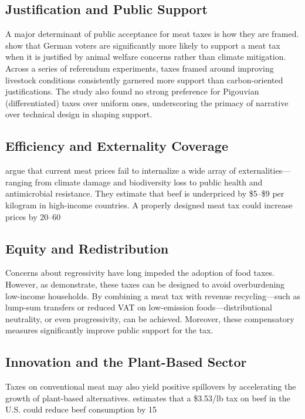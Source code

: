 \documentclass{article}[12pt,letterpaper]
\begin{document}
\subsection{Justification and Public Support}
A major determinant of public acceptance for meat taxes is how they are framed. \citet{Perino2023} show that German voters are significantly more likely to support a meat tax when it is justified by animal welfare concerns rather than climate mitigation. Across a series of referendum experiments, taxes framed around improving livestock conditions consistently garnered more support than carbon-oriented justifications. The study also found no strong preference for Pigouvian (differentiated) taxes over uniform ones, underscoring the primacy of narrative over technical design in shaping support.

\subsection{Efficiency and Externality Coverage}
\citet{Funke2022} argue that current meat prices fail to internalize a wide array of externalities—ranging from climate damage and biodiversity loss to public health and antimicrobial resistance. They estimate that beef is underpriced by \$5–\$9 per kilogram in high-income countries. A properly designed meat tax could increase prices by 20–60%

\subsection{Equity and Redistribution}
Concerns about regressivity have long impeded the adoption of food taxes. However, as \citet{Klenert2023} demonstrate, these taxes can be designed to avoid overburdening low-income households. By combining a meat tax with revenue recycling—such as lump-sum transfers or reduced VAT on low-emission foods—distributional neutrality, or even progressivity, can be achieved. Moreover, these compensatory measures significantly improve public support for the tax.

\subsection{Innovation and the Plant-Based Sector}
Taxes on conventional meat may also yield positive spillovers by accelerating the growth of plant-based alternatives. \citet{Zytkowicz2021} estimates that a \$3.53/lb tax on beef in the U.S. could reduce beef consumption by 15%
\end{document}
